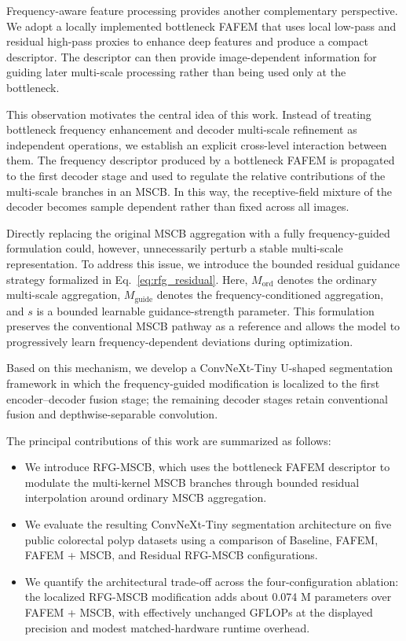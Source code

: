 Frequency-aware feature processing provides another complementary perspective. We adopt a locally implemented bottleneck FAFEM that uses local low-pass and residual high-pass proxies to enhance deep features and produce a compact descriptor. The descriptor can then provide image-dependent information for guiding later multi-scale processing rather than being used only at the bottleneck.

This observation motivates the central idea of this work. Instead of treating bottleneck frequency enhancement and decoder multi-scale refinement as independent operations, we establish an explicit cross-level interaction between them. The frequency descriptor produced by a bottleneck FAFEM is propagated to the first decoder stage and used to regulate the relative contributions of the multi-scale branches in an MSCB. In this way, the receptive-field mixture of the decoder becomes sample dependent rather than fixed across all images.

Directly replacing the original MSCB aggregation with a fully frequency-guided formulation could, however, unnecessarily perturb a stable multi-scale representation. To address this issue, we introduce the bounded residual guidance strategy formalized in Eq.~\eqref{eq:rfg_residual}. Here, $M_{\mathrm{ord}}$ denotes the ordinary multi-scale aggregation, $M_{\mathrm{guide}}$ denotes the frequency-conditioned aggregation, and $s$ is a bounded learnable guidance-strength parameter. This formulation preserves the conventional MSCB pathway as a reference and allows the model to progressively learn frequency-dependent deviations during optimization.

Based on this mechanism, we develop a ConvNeXt-Tiny U-shaped segmentation framework in which the frequency-guided modification is localized to the first encoder--decoder fusion stage; the remaining decoder stages retain conventional fusion and depthwise-separable convolution.

The principal contributions of this work are summarized as follows:

\begin{itemize}

\item We introduce RFG-MSCB, which uses the bottleneck FAFEM descriptor to modulate the multi-kernel MSCB branches through bounded residual interpolation around ordinary MSCB aggregation.

\item We evaluate the resulting ConvNeXt-Tiny segmentation architecture on five public colorectal polyp datasets using a comparison of Baseline, FAFEM, FAFEM + MSCB, and Residual RFG-MSCB configurations.

\item We quantify the architectural trade-off across the four-configuration ablation: the localized RFG-MSCB modification adds about 0.074 M parameters over FAFEM + MSCB, with effectively unchanged GFLOPs at the displayed precision and modest matched-hardware runtime overhead.
\end{itemize}
